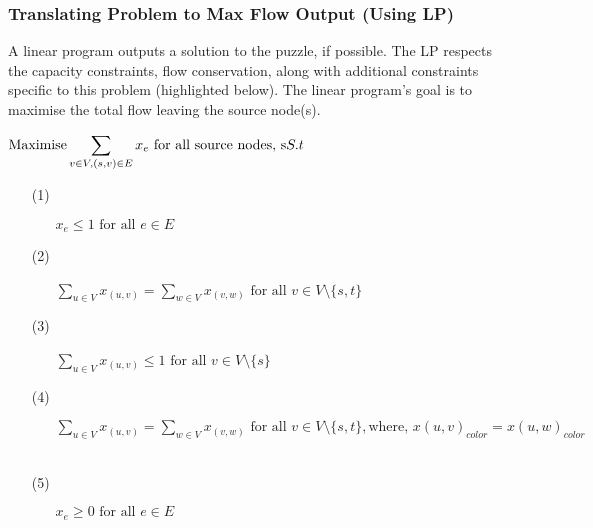 \documentclass{homeworg}
\begin{document}
\subsubsection{Translating Problem to Max Flow Output (Using LP)}
A linear program outputs a solution to the puzzle, if possible. The LP respects the capacity constraints, flow conservation, along with additional constraints specific to this problem (highlighted below). The linear program's goal is to maximise the total flow leaving the source node(s).\par
\(\text{Maximise} \displaystyle\sum_{v \in V, (s,v) \in E}x_e \text{ for all source nodes, s}\\
S.t\\\)
\begin{enumerate}
    \item[(1)] 
        \begin{enumerate}
        	\item[] \(x_e \leq 1 \text{ for all }e \in E\)
        \end{enumerate}
    \item[(2)]
        \begin{enumerate}
        	\item[] \(\displaystyle\sum_{u \in V}x_(u,v) = \displaystyle\sum_{w \in V}x_(v,w) \text{ for all } v \in V \text{\textbackslash} \{s, t\} \)\
        \end{enumerate}
    \item[(3)] 
        \begin{enumerate}
        	\item[] \(\displaystyle\sum_{u \in V}x_(u,v) \leq 1 \text{ for all } v \in V \text{\textbackslash} \{s\} \)\
        \end{enumerate}
    \item[(4)] 
        \begin{enumerate}
        	\item[] \(\displaystyle\sum_{u \in V}x_(u,v) = \displaystyle\sum_{w \in V}x_(v,w) \text{ for all } v \in V \text{\textbackslash} \{s, t\}, \text{where, } x(u,v)_{color} = x(u,w)_{color} \)\
        \end{enumerate}
    \item[(5)] 
        \begin{enumerate}
        	\item[] \(x_e \geq 0 \text{ for all } e \in E\)
    \end{enumerate}
\end{enumerate}
\end{document}
